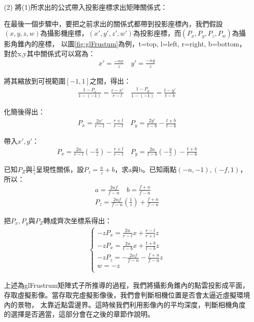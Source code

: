 	(2) 將(1)所求出的公式帶入投影座標求出矩陣關係式：
	
	在最後一個步驟中，要把之前求出的關係式都帶到投影座標內，我們假設$(x, y, z, w)$為攝影機座標，$(x', y', z', w')$為投影座標，而$(P_x,P_y,P_z,P_w)$為攝影角錐內的座標，
	以圖\ref{fig:glFrustum}為例，t=top, l=left, r=right, b=bottom，對於x,y其中關係式可以寫為：	
	\begin{align}
		x' = \frac{-nx}{z}  \quad y' = \frac{-ny}{z}
	\end{align}
	
	將其縮放到可視範圍$[-1,1]$之間，得出：	
	\begin{align}
		\frac{1-P_x}{1-(-1)} = \frac{r-x'}{r-l} \quad 	\frac{1-P_y}{1-(-1)} = \frac{t-y'}{t-b}
	\end{align}
	
	化簡後得出：
	\begin{align}
		P_x = \frac{2x'}{r-l} - \frac{r+l}{r-l} \quad   P_y = \frac{2y'}{t-b} - \frac{t+b}{t-b}
	\end{align}
	
	帶入$x',y'$：
	\begin{align}
		P_x = \frac{2n}{r-l} (-\frac{x}{z}) - \frac{r+l}{r-l} 	\quad	P_y = \frac{2n}{t-b} (-\frac{y}{z}) - \frac{t+b}{t-b} 
	\end{align}
	
	已知$P_Z$與$\frac{1}{z} $呈現性關係，設$P_z = \frac{a}{z}+b$，求a與b。已知兩點$(-n,-1),(-f,1)$，所以：
	\begin{align}
		a = \frac{2nf}{f-n} \quad b = \frac{f+n}{f-n} \\
		P_z = \frac{2nf}{f-n}(\frac{1}{z}) + \frac{f+n}{f-n} 
	\end{align}
	
	把$P_x, P_y$與$P_Z$轉成齊次坐標系得出：
	\begin{align}
		\left\{
		\begin{array}{ccc}
		-zP_x = \frac{2n}{r-l}x + \frac{r-l}{r+l}z  \\
		-zP_x = \frac{2n}{t-b}x + \frac{t+b}{t-b}z  \\
		-zP_z = -\frac{2nf}{f-n} - \frac{f+n}{f-n}z \\
		w = -z\\
		\end{array}
		\right.
	\end{align}
	
	上述為glFrustrum矩陣式子所推導的過程，我們將攝影角錐內的點雲投影成平面，存取虛擬影像。當存取完虛擬影像後，我們會判斷相機位置是否會太逼近虛擬環境內的景物，
	太靠近點雲邊界。這時候我們利用影像內的平均深度，判斷相機角度的選擇是否適當，這部分會在之後的章節作說明。
	
